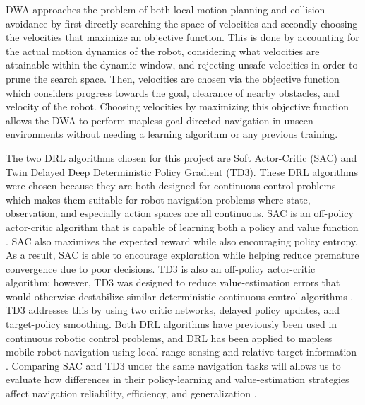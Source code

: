 \documentclass[conference]{IEEEtran}
\begin{document}
DWA approaches the problem of both local motion planning and collision avoidance by first directly searching the space of velocities and secondly choosing the velocities that maximize an objective function. 
This is done by accounting for the actual motion dynamics of the robot, considering what velocities are attainable within the dynamic window, and rejecting unsafe velocities in order to prune the search space.
Then, velocities are chosen via the objective function which considers progress towards the goal, clearance of nearby obstacles, and velocity of the robot. 
Choosing velocities by maximizing this objective function allows the DWA to perform mapless goal-directed navigation in unseen environments without needing a learning algorithm or any previous training.
\par
The two DRL algorithms chosen for this project are Soft Actor-Critic (SAC) and Twin Delayed Deep Deterministic Policy Gradient (TD3).
These DRL algorithms were chosen because they are both designed for continuous control problems which makes them suitable for robot navigation problems where state, observation, and especially action spaces are all continuous. 
SAC is an off-policy actor-critic algorithm that is capable of learning both a policy and value function \cite{Haarnoja_SAC}.
SAC also maximizes the expected reward while also encouraging policy entropy.
As a result, SAC is able to encourage exploration while helping reduce premature convergence due to poor decisions.
TD3 is also an off-policy actor-critic algorithm; however, TD3 was designed to reduce value-estimation errors that would otherwise destabilize similar deterministic continuous control algorithms \cite{Fujimoto_TD3}.
TD3 addresses this by using two critic networks, delayed policy updates, and target-policy smoothing.
Both DRL algorithms have previously been used in continuous robotic control problems, and DRL has been applied to mapless mobile robot navigation using local range sensing and relative target information \cite{Tai_Lei} \cite{8202312}.
Comparing SAC and TD3 under the same navigation tasks will allows us to evaluate how differences in their policy-learning and value-estimation strategies affect navigation reliability, efficiency, and generalization \cite{Dobrevski_Skočaj_2021} \cite{Tai_Lei}.
\end{document}
